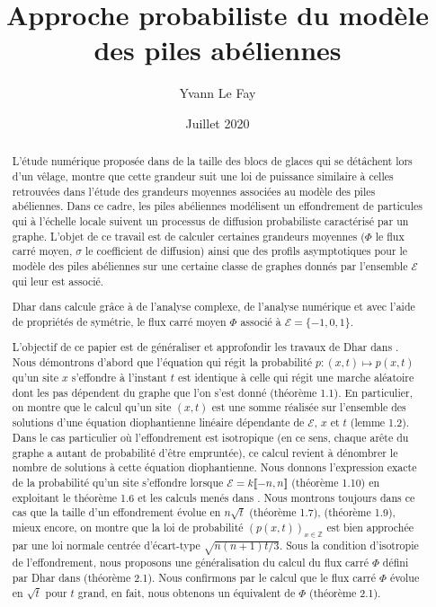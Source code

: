 \documentclass{article}
\begin{document}
\title{Approche probabiliste du modèle des piles abéliennes}
\author{Yvann Le Fay}
\date{Juillet 2020}
\maketitle
\begin{abstract}
	L'étude numérique proposée dans \cite{TGCCS} de la taille des blocs de glaces qui se détâchent lors d'un vêlage, montre que cette grandeur suit une loi de puissance similaire à celles retrouvées dans l'étude des grandeurs moyennes associées au modèle des piles abéliennes. Dans ce cadre, les piles abéliennes modélisent un effondrement de particules qui à l'échelle locale suivent un processus de diffusion probabiliste caractérisé par un graphe. 	
	L'objet de ce travail est de calculer certaines grandeurs moyennes ($\Phi$ le flux carré moyen, $\sigma$ le coefficient de diffusion) ainsi que des profils asymptotiques pour le modèle des piles abéliennes sur une certaine classe de graphes donnés par l'ensemble $\mathcal{E}$ qui leur est associé.
	
	Dhar dans \cite{DHARBIS} calcule grâce à de l'analyse complexe, de l'analyse numérique et avec l'aide de propriétés de symétrie, le flux carré moyen $\Phi$ associé à $\mathcal{E}=\{-1,0,1\}$.    
	
	L'objectif de ce papier est de généraliser et approfondir les travaux de Dhar dans \cite{DHARBIS}. Nous démontrons d'abord que l'équation qui régit la probabilité $p : (x,t) \mapsto p(x,t)$ qu'un site $x$ s'effondre à l'instant $t$ est identique à celle qui régit une marche aléatoire dont les pas dépendent du graphe que l'on s'est donné (théorème 1.1). En particulier, on montre que le calcul qu'un site $(x,t)$ est une somme réalisée sur l'ensemble des solutions d'une équation diophantienne linéaire dépendante de $\mathcal{E}$, $x$ et $t$ (lemme 1.2). Dans le cas particulier où l'effondrement est isotropique (en ce sens, chaque arête du graphe a autant de probabilité d'être empruntée), ce calcul revient à dénombrer le nombre de solutions à cette équation diophantienne. 	
	Nous donnons l'expression exacte de la probabilité qu'un site s'effondre lorsque $\mathcal{E}=k\llbracket -n,n\rrbracket$ (théorème 1.10) en exploitant le théorème 1.6 et les calculs menés dans \cite{h2}. Nous montrons toujours dans ce cas que la taille d'un effondrement évolue en $n\sqrt{t}$ (théorème 1.7), (théorème 1.9), mieux encore, on montre que la loi de probabilité $(p(x,t))_{x\in\mathbb{Z}}$ est bien approchée par une loi normale centrée d'écart-type $\sqrt{n(n+1)t/3}$. Sous la condition d'isotropie de l'effondrement, nous proposons une généralisation du calcul du flux carré $\Phi$ défini par Dhar dans \cite{DHARBIS} (théorème 2.1). Nous confirmons par le calcul que le flux carré $\Phi$ évolue en $\sqrt{t}$ pour $t$ grand, en fait, nous obtenons un équivalent de $\Phi$ (théorème 2.1).
	

\end{abstract}
\end{document}
